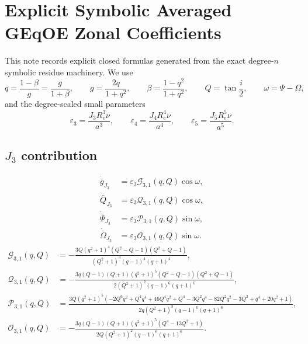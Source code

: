 \documentclass[10pt]{article}
\begin{document}
\small
\section*{Explicit Symbolic Averaged GEqOE Zonal Coefficients}
This note records explicit closed formulas generated from the exact degree-$n$ symbolic residue machinery.
We use
\begin{equation}
q = \frac{1-\beta}{g} = \frac{g}{1+\beta}, \qquad
g = \frac{2q}{1+q^2}, \qquad
\beta = \frac{1-q^2}{1+q^2}, \qquad
Q=\tan\frac{i}{2}, \qquad
\omega = \Psi - \Omega,
\end{equation}
and the degree-scaled small parameters
\begin{equation}
\varepsilon_3 = \frac{J_{3} R_{e}^{3} \nu}{a^{3}}, \qquad \varepsilon_4 = \frac{J_{4} R_{e}^{4} \nu}{a^{4}}, \qquad \varepsilon_5 = \frac{J_{5} R_{e}^{5} \nu}{a^{5}}.
\end{equation}

\subsection*{$J_3$ contribution}
\begin{align}
\dot{\bar g}_{J_3} &= \varepsilon_3 \mathcal{G}_{3,1}(q,Q)\cos\omega,\\
\dot{\bar Q}_{J_3} &= \varepsilon_3 \mathcal{Q}_{3,1}(q,Q)\cos\omega,\\
\dot{\bar\Psi}_{J_3} &= \varepsilon_3 \mathcal{P}_{3,1}(q,Q)\sin\omega,\\
\dot{\bar\Omega}_{J_3} &= \varepsilon_3 \mathcal{O}_{3,1}(q,Q)\sin\omega.
\end{align}
\begingroup\footnotesize
\begin{align}
\mathcal{G}_{3,1}(q,Q) &= - \frac{3 Q \left(q^{2} + 1\right)^{4} \left(Q^{2} - Q - 1\right) \left(Q^{2} + Q - 1\right)}{\left(Q^{2} + 1\right)^{3} \left(q - 1\right)^{4} \left(q + 1\right)^{4}},\\
\mathcal{Q}_{3,1}(q,Q) &= - \frac{3 q \left(Q - 1\right) \left(Q + 1\right) \left(q^{2} + 1\right)^{5} \left(Q^{2} - Q - 1\right) \left(Q^{2} + Q - 1\right)}{2 \left(Q^{2} + 1\right)^{2} \left(q - 1\right)^{6} \left(q + 1\right)^{6}},\\
\mathcal{P}_{3,1}(q,Q) &= \frac{3 Q \left(q^{2} + 1\right)^{5} \left(- 2 Q^{6} q^{2} + Q^{4} q^{4} + 46 Q^{4} q^{2} + Q^{4} - 3 Q^{2} q^{4} - 82 Q^{2} q^{2} - 3 Q^{2} + q^{4} + 20 q^{2} + 1\right)}{2 q \left(Q^{2} + 1\right)^{3} \left(q - 1\right)^{6} \left(q + 1\right)^{6}},\\
\mathcal{O}_{3,1}(q,Q) &= - \frac{3 q \left(Q - 1\right) \left(Q + 1\right) \left(q^{2} + 1\right)^{5} \left(Q^{4} - 13 Q^{2} + 1\right)}{2 Q \left(Q^{2} + 1\right)^{2} \left(q - 1\right)^{6} \left(q + 1\right)^{6}}.
\end{align}
\endgroup
\end{document}
